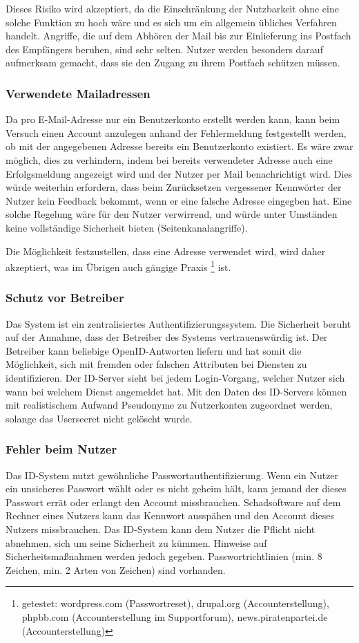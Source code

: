 Dieses Risiko wird akzeptiert, da die Einschränkung der Nutzbarkeit ohne eine solche Funktion zu hoch wäre und es sich um ein allgemein übliches Verfahren handelt.
Angriffe, die auf dem Abhören der Mail bis zur Einlieferung ins Postfach des Empfängers beruhen, sind sehr selten.
Nutzer werden besonders darauf aufmerksam gemacht, dass sie den Zugang zu ihrem Postfach schützen müssen.

\subsubsection{Verwendete Mailadressen}
Da pro E-Mail-Adresse nur ein Benutzerkonto erstellt werden kann, kann beim Versuch einen Account anzulegen anhand der Fehlermeldung festgestellt werden,
ob mit der angegebenen Adresse bereits ein Benutzerkonto existiert.
Es wäre zwar möglich, dies zu verhindern, indem bei bereits verwendeter Adresse auch eine Erfolgsmeldung angezeigt wird und der Nutzer per Mail benachrichtigt wird.
Dies würde weiterhin erfordern, dass beim Zurücksetzen vergessener Kennwörter der Nutzer kein Feedback bekommt, wenn er eine falsche Adresse eingegben hat.
Eine solche Regelung wäre für den Nutzer verwirrend, und würde unter Umständen keine vollständige Sicherheit bieten (Seitenkanalangriffe).

Die Möglichkeit festzustellen, dass eine Adresse verwendet wird, wird daher akzeptiert,
was im Übrigen auch gängige Praxis
\footnote{getestet: wordpress.com (Passwortreset), drupal.org (Accounterstellung), phpbb.com (Accounterstellung im Supportforum), news.piratenpartei.de (Accounterstellung)}
ist.

\subsubsection{Schutz vor Betreiber}
Das System ist ein zentralisiertes Authentifizierungssystem.
Die Sicherheit beruht auf der Annahme, dass der Betreiber des Systems vertrauenswürdig ist.
Der Betreiber kann beliebige OpenID-Antworten liefern und hat somit die Möglichkeit, sich mit fremden oder falschen Attributen bei Diensten zu identifizieren.
Der ID-Server sieht bei jedem Login-Vorgang, welcher Nutzer sich wann bei welchem Dienst angemeldet hat.
Mit den Daten des ID-Servers können mit realistischem Aufwand Pseudonyme zu Nutzerkonten zugeordnet werden, solange das Usersecret nicht gelöscht wurde.

\subsubsection{Fehler beim Nutzer}
Das ID-System nutzt gewöhnliche Passwortauthentifizierung.
Wenn ein Nutzer ein unsicheres Passwort wählt oder es nicht geheim hält, kann jemand der dieses Passwort errät oder erlangt den Account missbrauchen.
Schadsoftware auf dem Rechner eines Nutzers kann das Kennwort ausspähen und den Account dieses Nutzers missbrauchen.
Das ID-System kann dem Nutzer die Pflicht nicht abnehmen, sich um seine Sicherheit zu kümmen. Hinweise auf Sicherheitsmaßnahmen werden jedoch gegeben.
Passwortrichtlinien (min. 8 Zeichen, min. 2 Arten von Zeichen) sind vorhanden.

